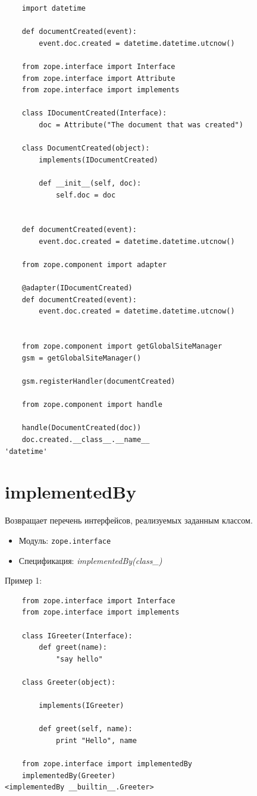 \documentclass[a4paper,openany,twoside,final]{book}
\providecommand*{\DUroletitlereference}[1]{\textsl{#1}}
\begin{document}
\begin{verbatim}
    import datetime

    def documentCreated(event):
        event.doc.created = datetime.datetime.utcnow()

    from zope.interface import Interface
    from zope.interface import Attribute
    from zope.interface import implements

    class IDocumentCreated(Interface):
        doc = Attribute("The document that was created")

    class DocumentCreated(object):
        implements(IDocumentCreated)

        def __init__(self, doc):
            self.doc = doc


    def documentCreated(event):
        event.doc.created = datetime.datetime.utcnow()

    from zope.component import adapter

    @adapter(IDocumentCreated)
    def documentCreated(event):
        event.doc.created = datetime.datetime.utcnow()


    from zope.component import getGlobalSiteManager
    gsm = getGlobalSiteManager()

    gsm.registerHandler(documentCreated)

    from zope.component import handle

    handle(DocumentCreated(doc))
    doc.created.__class__.__name__
'datetime'
\end{verbatim}


\section*{implementedBy%
  \label{implementedby}%
}

Возвращает перечень интерфейсов, реализуемых заданным классом.

\begin{itemize}

\item Модуль: \texttt{zope.interface}

\item Спецификация: \DUroletitlereference{implementedBy(class\_)}

\end{itemize}

Пример 1:

\begin{verbatim}
    from zope.interface import Interface
    from zope.interface import implements

    class IGreeter(Interface):
        def greet(name):
            "say hello"

    class Greeter(object):

        implements(IGreeter)

        def greet(self, name):
            print "Hello", name

    from zope.interface import implementedBy
    implementedBy(Greeter)
<implementedBy __builtin__.Greeter>
\end{verbatim}
\end{document}
